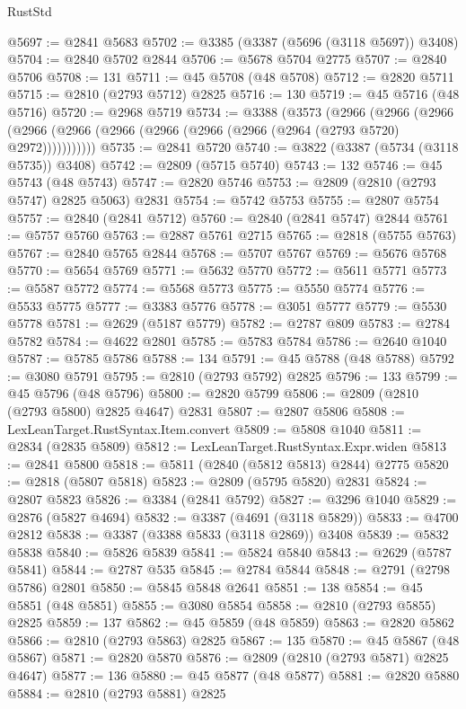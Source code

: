 \begin{lexlean}{RustStd}
\begin{coremodule}
@5697 := @2841 @5683
@5702 := @3385 (@3387 (@5696 (@3118 @5697)) @3408)
@5704 := @2840 @5702 @2844
@5706 := @5678 @5704 @2775
@5707 := @2840 @5706
@5708 := 131
@5711 := @45 @5708 (@48 @5708)
@5712 := @2820 @5711
@5715 := @2810 (@2793 @5712) @2825
@5716 := 130
@5719 := @45 @5716 (@48 @5716)
@5720 := @2968 @5719
@5734 := @3388
    (@3573
      (@2966
        (@2966
          (@2966 (@2966 (@2966 (@2966 (@2966 (@2966 (@2966 (@2964 (@2793 @5720) @2972)))))))))))
@5735 := @2841 @5720
@5740 := @3822 (@3387 (@5734 (@3118 @5735)) @3408)
@5742 := @2809 (@5715 @5740)
@5743 := 132
@5746 := @45 @5743 (@48 @5743)
@5747 := @2820 @5746
@5753 := @2809 (@2810 (@2793 @5747) @2825 @5063) @2831
@5754 := @5742 @5753
@5755 := @2807 @5754
@5757 := @2840 (@2841 @5712)
@5760 := @2840 (@2841 @5747) @2844
@5761 := @5757 @5760
@5763 := @2887 @5761 @2715
@5765 := @2818 (@5755 @5763)
@5767 := @2840 @5765 @2844
@5768 := @5707 @5767
@5769 := @5676 @5768
@5770 := @5654 @5769
@5771 := @5632 @5770
@5772 := @5611 @5771
@5773 := @5587 @5772
@5774 := @5568 @5773
@5775 := @5550 @5774
@5776 := @5533 @5775
@5777 := @3383 @5776
@5778 := @3051 @5777
@5779 := @5530 @5778
@5781 := @2629 (@5187 @5779)
@5782 := @2787 @809
@5783 := @2784 @5782
@5784 := @4622 @2801
@5785 := @5783 @5784
@5786 := @2640 @1040
@5787 := @5785 @5786
@5788 := 134
@5791 := @45 @5788 (@48 @5788)
@5792 := @3080 @5791
@5795 := @2810 (@2793 @5792) @2825
@5796 := 133
@5799 := @45 @5796 (@48 @5796)
@5800 := @2820 @5799
@5806 := @2809 (@2810 (@2793 @5800) @2825 @4647) @2831
@5807 := @2807 @5806
@5808 := LexLeanTarget.RustSyntax.Item.convert
@5809 := @5808 @1040
@5811 := @2834 (@2835 @5809)
@5812 := LexLeanTarget.RustSyntax.Expr.widen
@5813 := @2841 @5800
@5818 := @5811 (@2840 (@5812 @5813) @2844) @2775
@5820 := @2818 (@5807 @5818)
@5823 := @2809 (@5795 @5820) @2831
@5824 := @2807 @5823
@5826 := @3384 (@2841 @5792)
@5827 := @3296 @1040
@5829 := @2876 (@5827 @4694)
@5832 := @3387 (@4691 (@3118 @5829))
@5833 := @4700 @2812
@5838 := @3387 (@3388 @5833 (@3118 @2869)) @3408
@5839 := @5832 @5838
@5840 := @5826 @5839
@5841 := @5824 @5840
@5843 := @2629 (@5787 @5841)
@5844 := @2787 @535
@5845 := @2784 @5844
@5848 := @2791 (@2798 @5786) @2801
@5850 := @5845 @5848 @2641
@5851 := 138
@5854 := @45 @5851 (@48 @5851)
@5855 := @3080 @5854
@5858 := @2810 (@2793 @5855) @2825
@5859 := 137
@5862 := @45 @5859 (@48 @5859)
@5863 := @2820 @5862
@5866 := @2810 (@2793 @5863) @2825
@5867 := 135
@5870 := @45 @5867 (@48 @5867)
@5871 := @2820 @5870
@5876 := @2809 (@2810 (@2793 @5871) @2825 @4647)
@5877 := 136
@5880 := @45 @5877 (@48 @5877)
@5881 := @2820 @5880
@5884 := @2810 (@2793 @5881) @2825

\end{coremodule}
\end{lexlean}

